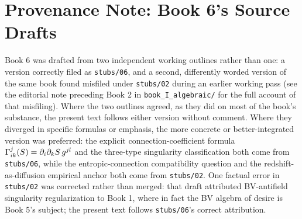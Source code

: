 \chapter*{Provenance Note: Book 6's Source Drafts}

Book 6 was drafted from two independent working outlines rather than one: a version correctly filed as \texttt{stubs/06}, and a second, differently worded version of the same book found misfiled under \texttt{stubs/02} during an earlier working pass (see the editorial note preceding Book 2 in \texttt{book\_I\_algebraic/} for the full account of that misfiling). Where the two outlines agreed, as they did on most of the book's substance, the present text follows either version without comment. Where they diverged in specific formulas or emphasis, the more concrete or better-integrated version was preferred: the explicit connection-coefficient formula $\Gamma^j_{ik}(S) = \partial_i\partial_kS\, g^{jl}$ and the three-type singularity classification both come from \texttt{stubs/06}, while the entropic-connection compatibility question and the redshift-as-diffusion empirical anchor both come from \texttt{stubs/02}. One factual error in \texttt{stubs/02} was corrected rather than merged: that draft attributed BV-antifield singularity regularization to Book 1, where in fact the BV algebra of desire is Book 5's subject; the present text follows \texttt{stubs/06}'s correct attribution.
